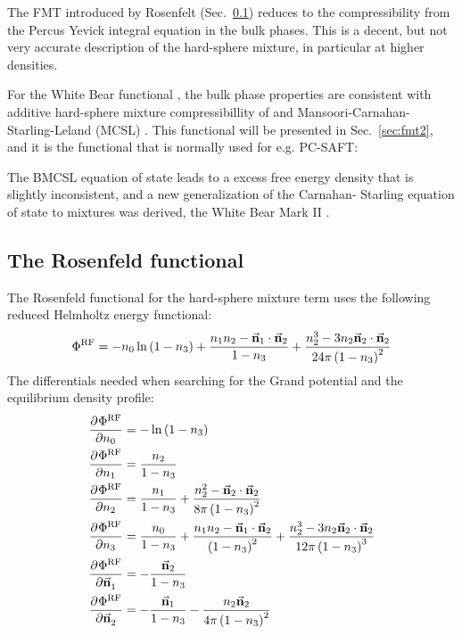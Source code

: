 \documentclass[12pt, letterpaper]{article}
\newcommand*{\pd}[3][]{\frac{\partial^{#1}#2}{\partial{#3}^{#1}}}%
\newcommand*{\vc}[1]{\vec{\mathbf{#1}}}%
\newcommand*{\lb}{\ensuremath{\left(}}
\newcommand*{\rb}{\ensuremath{\right)}}
\newcommand{\RF}{\ensuremath{\text{RF}}\xspace}
\begin{document}
The FMT introduced by Rosenfelt (Sec.~\ref{sec:fmt1}) reduces to the compressibility from the Percus Yevick integral equation in the bulk phases. This is a decent, but not very accurate description of the hard-sphere mixture, in particular at higher densities.

For the White Bear functional \cite{roth2002}, the bulk phase
properties are consistent with additive hard-sphere mixture
compressibillity of \citet{boublik1970} and
Mansoori-Carnahan-Starling-Leland (MCSL) \cite{mansoori1971}.
This functional will be presented in Sec.~\ref{sec:fmt2}, and it is the functional that is normally used for e.g. PC-SAFT:

The BMCSL equation of state leads to a excess free energy density that
is slightly inconsistent, and a new generalization of the Carnahan-
Starling \cite{carnahan1969} equation of state to mixtures was derived,
the White Bear Mark II \cite{hansen-goos2006a}.




\subsection{The Rosenfeld functional}
\label{sec:fmt1}
The Rosenfeld functional for the hard-sphere mixture term uses the following reduced Helmholtz energy functional:
\begin{equation}
  \Phi^\RF = -n_0 \ln \lb 1 - n_3 \rb +
  \frac{n_1 n_2 - \vc{n}_1 \cdot \vc{n}_2}{1 - n_3} +
  \frac{n_2^3 - 3 n_2 \vc{n}_2 \cdot \vc{n}_2}{24\pi \lb 1 - n_3 \rb^2}
\end{equation}
The differentials needed when searching for the Grand potential and the equilibrium density profile:
\begin{align}
  \pd{\Phi^\RF}{n_0} &= -\ln \lb 1 - n_3 \rb \\
  \pd{\Phi^\RF}{n_1} &= \frac{n_2}{1 - n_3} \\
  \pd{\Phi^\RF}{n_2} &= \frac{n_1}{1 - n_3} + \frac{n_2^2 - \vc{n}_2 \cdot \vc{n}_2}{8\pi \lb 1 - n_3 \rb^2} \\
  \pd{\Phi^\RF}{n_3} &= \frac{n_0}{1 - n_3} +
  \frac{n_1 n_2 - \vc{n}_1 \cdot \vc{n}_2}{\lb 1 - n_3 \rb^2} +
  \frac{n_2^3 - 3 n_2 \vc{n}_2 \cdot \vc{n}_2}{12\pi \lb 1 - n_3 \rb^3} \\
  \pd{\Phi^\RF}{\vc{n}_1} &=  - \frac{\vc{n}_2}{1 - n_3} \\
  \pd{\Phi^\RF}{\vc{n}_2} &=  -\frac{\vc{n}_1}{1 - n_3} - \frac{n_2 \vc{n}_2}{4\pi \lb 1 - n_3 \rb^2}
\end{align}
\end{document}
